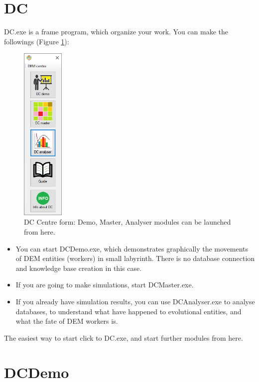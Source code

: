 \documentclass[a4paper,12pt]{article}
\begin{document}
\section{DC}

DC.exe is a frame program, which organize your work. You can make the followings (Figure \ref{fig:dcstart}):

\begin{figure}
	\centering
	\includegraphics[width=2cm]{dcstart.png}
	\caption{DC Centre form: Demo,  Master, Analyser modules can be launched from here.}
	\label{fig:dcstart}
\end{figure}



\begin{itemize}
	\item You can start DCDemo.exe, which demonstrates graphically the movements of DEM entities (workers) in small labyrinth. There is no database connection and knowledge base creation in this case.
	\item If you are going to make simulations, start DCMaster.exe.
	\item If you already have simulation results, you can use DCAnalyser.exe to analyse databases, to understand what have happened to evolutional entities, and what the fate of DEM workers is.
\end{itemize}

The easiest way to start click to DC.exe, and start further modules from here.



\section{DCDemo}
\end{document}
